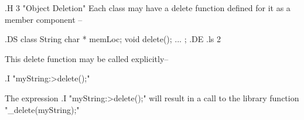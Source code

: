 
.H 3 "Object Deletion"
Each class may have a delete function defined for it as a member
component --

.DS
class String
	{ char * memLoc;
	  void delete();
		...
	};
.DE
.ls 2

This delete function may be called explicitly--

.I "myString:>delete();"

The expression 
.I "myString:>delete();"
will result in a call to the library function "_delete(myString);"

